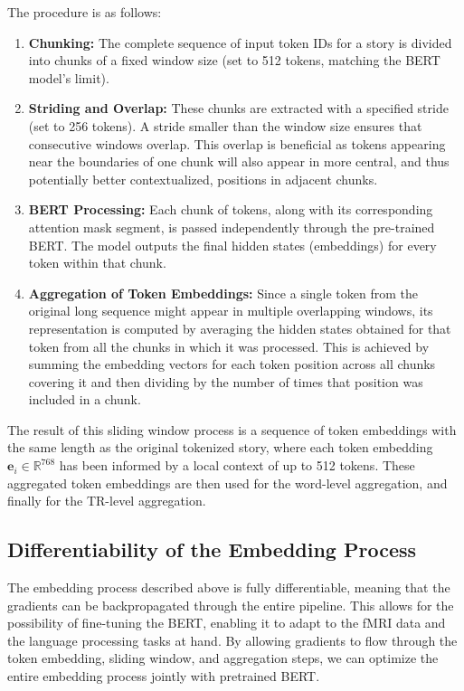 \documentclass[10pt,letterpaper]{article}
\begin{document}
The procedure is as follows:
\begin{enumerate}
    \item \textbf{Chunking:} The complete sequence of input token IDs for a story is divided into chunks of a fixed window size (set to 512 tokens, matching the BERT model's limit).
    \item \textbf{Striding and Overlap:} These chunks are extracted with a specified stride (set to 256 tokens). A stride smaller than the window size ensures that consecutive windows overlap. This overlap is beneficial as tokens appearing near the boundaries of one chunk will also appear in more central, and thus potentially better contextualized, positions in adjacent chunks.
    \item \textbf{BERT Processing:} Each chunk of tokens, along with its corresponding attention mask segment, is passed independently through the pre-trained BERT. The model outputs the final hidden states (embeddings) for every token within that chunk.
    \item \textbf{Aggregation of Token Embeddings:} Since a single token from the original long sequence might appear in multiple overlapping windows, its representation is computed by averaging the hidden states obtained for that token from all the chunks in which it was processed. This is achieved by summing the embedding vectors for each token position across all chunks covering it and then dividing by the number of times that position was included in a chunk.
\end{enumerate}
The result of this sliding window process is a sequence of token embeddings with the same length as the original tokenized story, where each token embedding \( \mathbf{e}_i \in \mathbb{R}^{768} \) has been informed by a local context of up to 512 tokens. These aggregated token embeddings are then used for the word-level aggregation, and finally for the TR-level aggregation.

\subsection{Differentiability of the Embedding Process}
The embedding process described above is fully differentiable, meaning that the gradients can be backpropagated through the entire pipeline. This allows for the possibility of fine-tuning the BERT, enabling it to adapt to the fMRI data and the language processing tasks at hand. By allowing gradients to flow through the token embedding, sliding window, and aggregation steps, we can optimize the entire embedding process jointly with pretrained BERT.
\end{document}
